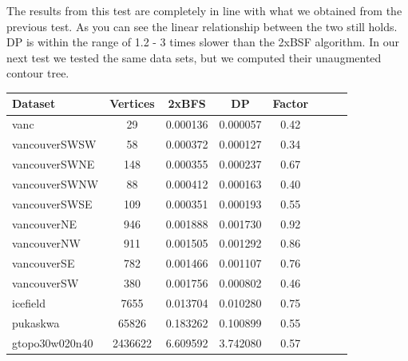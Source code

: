 The results from this test are completely in line with what we obtained from the previous test. As you can see the linear relationship between the two still holds. DP is within the range of 1.2 - 3 times slower than the 2xBSF algorithm. In our next test we tested the same data sets, but we computed their unaugmented contour tree.

\begin{center}
\begin{tabular}{l*{6}{c}r}
Dataset                & Vertices                    & 2xBFS                             & DP                    & Factor \\
\hline
vanc	               & 29    	                     & 0.000136	                         & 0.000057	              & 0.42  \\
vancouverSWSW	       & 58   	                     & 0.000372	                         & 0.000127	              & 0.34  \\
vancouverSWNE	       & 148  	                     & 0.000355	                         & 0.000237	              & 0.67  \\
vancouverSWNW	       & 88   	                     & 0.000412	                         & 0.000163	              & 0.40  \\
vancouverSWSE	       & 109  	                     & 0.000351	                         & 0.000193	              & 0.55  \\
vancouverNE	           & 946    	                 & 0.001888	                         & 0.001730	              & 0.92  \\
vancouverNW	           & 911    	                 & 0.001505	                         & 0.001292	              & 0.86  \\
vancouverSE	           & 782    	                 & 0.001466	                         & 0.001107	              & 0.76  \\
vancouverSW	           & 380    	                 & 0.001756	                         & 0.000802	              & 0.46  \\
icefield	           & 7655  	                     & 0.013704	                         & 0.010280	              & 0.75  \\
pukaskwa	           & 65826 	                     & 0.183262	                         & 0.100899	              & 0.55  \\
gtopo30w020n40	       & 2436622 	                 & 6.609592	                         & 3.742080	              & 0.57  \\

\end{tabular}
\end{center}


